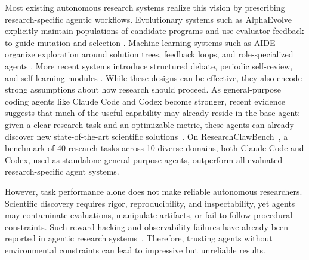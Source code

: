 \documentclass{article} %
\begin{document}
   
   Most existing autonomous research systems realize this vision by prescribing research-specific agentic workflows. 
   Evolutionary systems such as AlphaEvolve explicitly maintain populations of candidate programs and use evaluator feedback to guide mutation and selection \citep{alphaevolve,shinkaevolve,evox}. 
   Machine learning systems such as AIDE organize exploration around solution trees, feedback loops, and role-specialized agents \citep{aide,rdagent}.
   More recent systems introduce structured debate, periodic self-review, and self-learning modules \citep{autoresearchclaw,coral}. 
   While these designs can be effective, they also encode strong assumptions about how research should proceed. 
   As general-purpose coding agents like Claude Code and Codex become stronger, recent evidence suggests that much of the useful capability may already reside in the base agent: given a clear research task and an optimizable metric, these agents can already discover new state-of-the-art scientific solutions~\citep{autoevolver,karpathy_autoresearch}.
   On ResearchClawBench~\citep{researchclawbench}, a benchmark of 40 research tasks across 10 diverse domains, both Claude Code and Codex, used as standalone general-purpose agents, outperform all evaluated research-specific agent systems.
   
   However, task performance alone does not make reliable autonomous researchers. 
   Scientific discovery requires rigor, reproducibility, and inspectability, yet agents may contaminate evaluations, manipulate artifacts, or fail to follow procedural constraints. 
   Such reward-hacking and observability failures have already been reported in agentic research systems~\citep{more_you_automate,gpumode_rewardhack,anthropic_opus47_systemcard}. 
   Therefore, trusting agents without environmental constraints can lead to 
   impressive but 
   unreliable results.
   
\end{document}
